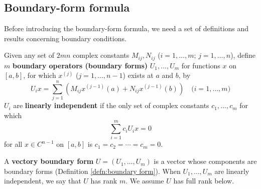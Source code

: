 \documentclass[11pt, oneside, a4paper]{article}
\begin{document}
\subsection{Boundary-form formula}
Before introducing the boundary-form formula, we need a set of definitions and results concerning boundary conditions.

\begin{defn}\cite[p.286]{CoddingtonLevinson}\label{defn:boundary form}
    Given any set of $2mn$ complex constants $M_{ij}, N_{ij}$ ($i=1,\ldots, m;\,j=1,\ldots,n$), define $m$ \textbf{boundary operators (boundary forms)} $U_1,\ldots,U_m$ for functions $x$ on $[a,b]$, for which $x^{(j)}$ ($j=1,\ldots,n-1$) exists at $a$ and $b$, by
    \begin{equation}\label{eq:U_i defn}
        U_i x = \sum_{j=1}^n (M_{ij}x^{(j-1)}(a) + N_{ij}x^{(j-1)}(b))\quad\mbox{($i=1,\ldots,m$)} 
    \end{equation}
    $U_i$ are \textbf{linearly independent} if the only set of complex constants $c_1, \ldots, c_m$ for which
    \[\sum_{i=1}^m c_i U_ix=0\]
    for all $x\in C^{n-1}$ on $[a,b]$ is $c_1=c_2=\cdots =c_m=0$.
\end{defn}

\begin{defn}\cite[p.286]{CoddingtonLevinson}\label{defn:vectory boundary form}
    A \textbf{vectory boundary form} $U=(U_1,\ldots,U_m)$ is a vector whose components are boundary forms (Definition \ref{defn:boundary form}). When $U_1,\ldots,U_m$ are linearly independent, we say that $U$ has rank $m$. We assume $U$ has full rank below.
\end{defn}
\end{document}
